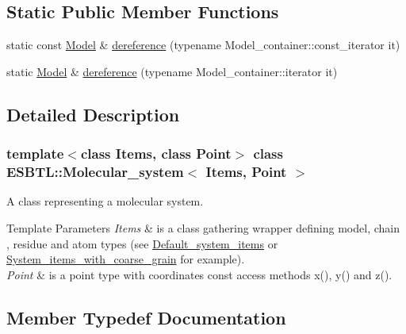 \subsection*{Static Public Member Functions}
\begin{DoxyCompactItemize}
\item 
static const \hyperlink{classESBTL_1_1Molecular__system_ac99c9f22457fd0498324fb5cfc276227}{Model} \& \hyperlink{classESBTL_1_1Molecular__system_af6cbfc5a6e1bbc5168552fe6737ef07b}{dereference} (typename Model\+\_\+container\+::const\+\_\+iterator it)
\item 
static \hyperlink{classESBTL_1_1Molecular__system_ac99c9f22457fd0498324fb5cfc276227}{Model} \& \hyperlink{classESBTL_1_1Molecular__system_a8fd09025074fb056d79eb0c79fa03afd}{dereference} (typename Model\+\_\+container\+::iterator it)
\end{DoxyCompactItemize}


\subsection{Detailed Description}
\subsubsection*{template$<$class Items, class Point$>$\newline
class E\+S\+B\+T\+L\+::\+Molecular\+\_\+system$<$ Items, Point $>$}

A class representing a molecular system. 
\begin{DoxyTemplParams}{Template Parameters}
{\em Items} & is a class gathering wrapper defining model, chain , residue and atom types (see \hyperlink{structESBTL_1_1Default__system__items}{Default\+\_\+system\+\_\+items} or \hyperlink{structESBTL_1_1System__items__with__coarse__grain}{System\+\_\+items\+\_\+with\+\_\+coarse\+\_\+grain} for example). \\
\hline
{\em Point} & is a point type with coordinates const access methods x(), y() and z(). \\
\hline
\end{DoxyTemplParams}


\subsection{Member Typedef Documentation}
\mbox{\label{classESBTL_1_1Molecular__system_aae37491a328fde3bc58171d68c998c7c}} 
